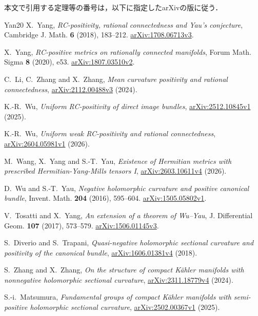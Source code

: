 \documentclass[12pt]{amsart}
\theoremstyle{definition}
\theoremstyle{remark}
\numberwithin{equation}{section}
\theoremstyle{definition}
\begin{document}
\medskip
\noindent 本文で引用する定理等の番号は，以下に指定したarXivの版に従う．
\begin{thebibliography}{Yan20}
 X.~Yang, \emph{RC-positivity, rational connectedness and Yau's conjecture},
Cambridge J. Math. \textbf{6} (2018), 183--212.
\href{https://arxiv.org/abs/1708.06713v3}{arXiv:1708.06713v3}.

 X.~Yang, \emph{RC-positive metrics on rationally connected manifolds},
Forum Math. Sigma \textbf{8} (2020), e53.
\href{https://arxiv.org/abs/1807.03510v2}{arXiv:1807.03510v2}.

 C.~Li, C.~Zhang and X.~Zhang,
\emph{Mean curvature positivity and rational connectedness},
\href{https://arxiv.org/abs/2112.00488v3}{arXiv:2112.00488v3} (2024).

 K.-R.~Wu, \emph{Uniform RC-positivity of direct image bundles},
\href{https://arxiv.org/abs/2512.10845v1}{arXiv:2512.10845v1} (2025).

 K.-R.~Wu, \emph{Uniform weak RC-positivity and rational connectedness},
\href{https://arxiv.org/abs/2604.05981v1}{arXiv:2604.05981v1} (2026).

 M.~Wang, X.~Yang and S.-T.~Yau,
\emph{Existence of Hermitian metrics with prescribed Hermitian-Yang-Mills tensors I},
\href{https://arxiv.org/abs/2603.10611v4}{arXiv:2603.10611v4} (2026).

 D.~Wu and S.-T.~Yau,
\emph{Negative holomorphic curvature and positive canonical bundle},
Invent. Math. \textbf{204} (2016), 595--604.
\href{https://arxiv.org/abs/1505.05802v1}{arXiv:1505.05802v1}.

 V.~Tosatti and X.~Yang, \emph{An extension of a theorem of Wu--Yau},
J. Differential Geom. \textbf{107} (2017), 573--579.
\href{https://arxiv.org/abs/1506.01145v3}{arXiv:1506.01145v3}.

 S.~Diverio and S.~Trapani,
\emph{Quasi-negative holomorphic sectional curvature and positivity of the canonical bundle},
\href{https://arxiv.org/abs/1606.01381v4}{arXiv:1606.01381v4} (2018).

 S.~Zhang and X.~Zhang,
\emph{On the structure of compact K\"ahler manifolds with nonnegative holomorphic sectional curvature},
\href{https://arxiv.org/abs/2311.18779v4}{arXiv:2311.18779v4} (2024).

 S.-i.~Matsumura,
\emph{Fundamental groups of compact K\"ahler manifolds with semi-positive holomorphic sectional curvature},
\href{https://arxiv.org/abs/2502.00367v1}{arXiv:2502.00367v1} (2025).

\end{thebibliography}
\end{document}
